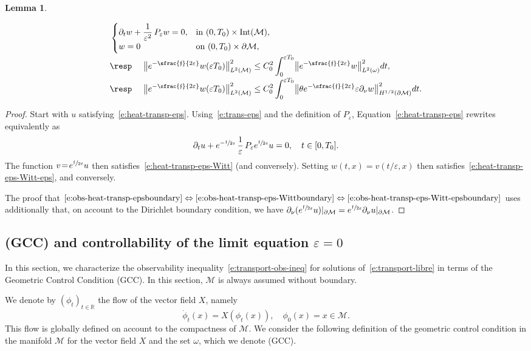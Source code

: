 \documentclass[JEP,XML,SOM,Unicode]{cedram}
\newcommand{\pGCC}{\textup{(GCC)}\xspace}
\newtheorem{lemma}{Lemma}[section]
\theoremstyle{definition}
\newcommand{\M}{\ensuremath{\mathcal M}}
\newcommand{\mb}[1]{\ensuremath{\mathbb{#1}}}
\newcommand{\R}{{\mb{R}}}
\newcommand{\f}{\ensuremath{\mathfrak{f}}}
\DeclareMathOperator{\Int}{Int}
\newcommand\bnp{\begin{proof}}
\newcommand\enp{\end{proof}}
\newcommand\bnor[2]{\bigl\|#1\bigr\|_{#2}}
\let\d\partial
\let\eps\varepsilon
\begin{document}
\begin{lemma}
\begin{enumerate}
\begin{align}
\label{e:heat-transp-eps-Witt-eps}
&\begin{cases}
\partial_t w + \dfrac{1}{\eps^2}\,P_\eps w =0, & \text{in } (0,T_0)\times\Int(\M), \\
w = 0 & \text{on } (0,T_0)\times \d\M,
\end{cases}
\\[-2pt]
&\text{\resp }\quad \bnor{e^{-\sfrac{\f}{2\eps}}w(\eps T_0)}{L^2(\M)}^2 \leq C_0^2\int_0^{\eps T_0}\bnor{e^{-\sfrac{\f}{2\eps}}w}{L^2(\omega)}^2 dt,\nonumber \\[-2pt]
\label{e:obs-heat-transp-eps-Witt-epsboundary}
&\text{\resp } \quad \bnor{e^{-\sfrac{\f}{2\eps}}w(\eps T_0)}{L^2(\M)}^2 \leq C_0^2\int_0^{\eps T_0}\bnor{\theta e^{-\sfrac{\f}{2\eps}} \eps \partial_{\nu}w}{H^{1/2}(\d\M)}^2 dt.
\end{align}
\end{enumerate}
\end{lemma}
\bnp
Start \eg with $u$ satisfying~\eqref{e:heat-transp-eps}.
Using~\eqref{e:trans-eps} and the definition of $P_\eps$, Equation~\eqref{e:heat-transp-eps} rewrites equivalently as\vspace*{-3pt}
\[
\partial_t u + e^{-\sfrac{\f}{2\eps}}\, \frac{1}{\eps}\,P_\eps e^{\sfrac{\f}{2\eps}} u=0, \quad t \in [0,T_0].
\]
The function $v\!=\! e^{\sfrac{\f}{2\eps}} u$ then satisfies~\eqref{e:heat-transp-eps-Witt} (and conversely). Setting $w(t,x) \!=\! v(t/\eps, x)$ then satisfies~\eqref{e:heat-transp-eps-Witt-eps}, and conversely.

The proof that $\eqref{e:obs-heat-transp-epsboundary}\Leftrightarrow\eqref{e:obs-heat-transp-eps-Wittboundary}\Leftrightarrow\eqref{e:obs-heat-transp-eps-Witt-epsboundary}$ uses additionally that, on account to the Dirichlet boundary condition, we have $\d_\nu(e^{\sfrac{\f}{2\eps}} u) |_{\d\M} =e^{\sfrac{\f}{2\eps}} \d_\nu u |_{\d\M}$.
\enp

\subsection{\pGCC and controllability of the limit equation $\eps=0$}
\label{s:GCC}
In this section, we characterize the observability inequality~\eqref{e:transport-obs-ineq} for solutions of~\eqref{e:transport-libre} in terms of the Geometric Control Condition \pGCC. In this section, $\M$ is always assumed without boundary.

We denote by $(\phi_t)_{t\in \R}$ the flow of the vector field $X$, namely\vspace*{-3pt}
\begin{equation}
\label{e:def-flot}
\dot{\phi}_t(x) = X(\phi_t(x)),\quad \phi_0(x) = x \in \M.
\end{equation}
This flow is globally defined on account to the compactness of $\M$.
We consider the following definition of the geometric control condition in the manifold $\M$ for the vector field $X$ and the set $\omega$, which we denote \pGCC.
\end{document}
